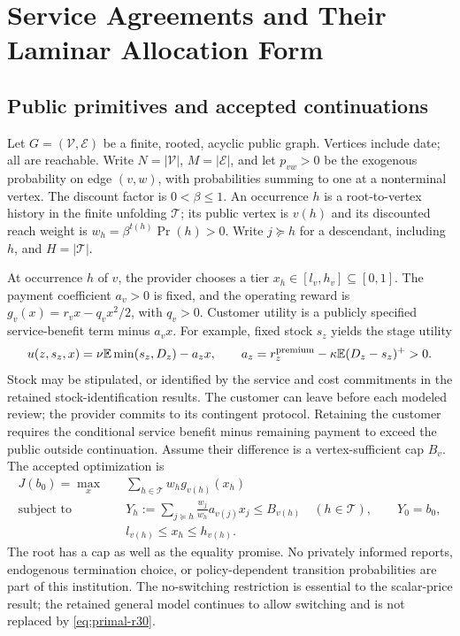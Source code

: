 \section{Service Agreements and Their Laminar Allocation Form}\label{sec:model}
\subsection{Public primitives and accepted continuations}
Let $G=(\mathcal V,\mathcal E)$ be a finite, rooted, acyclic public graph. Vertices include date; all are reachable. Write $N=|\mathcal V|$, $M=|\mathcal E|$, and let $p_{vw}>0$ be the exogenous probability on edge $(v,w)$, with probabilities summing to one at a nonterminal vertex. The discount factor is $0<\beta\leq1$. An occurrence $h$ is a root-to-vertex history in the finite unfolding $\mathcal T$; its public vertex is $v(h)$ and its discounted reach weight is $w_h=\beta^{t(h)}\Pr(h)>0$. Write $j\succeq h$ for a descendant, including $h$, and $H=|\mathcal T|$.

At occurrence $h$ of $v$, the provider chooses a tier $x_h\in[l_v,h_v]\subseteq[0,1]$. The payment coefficient $a_v>0$ is fixed, and the operating reward is $g_v(x)=r_vx-q_vx^2/2$, with $q_v>0$. Customer utility is a publicly specified service-benefit term minus $a_vx$. For example, fixed stock $s_z$ yields the stage utility
\begin{equation}\label{eq:customer-r30}
 u(z,s_z,x)=\nu\mathbb E\min(s_z,D_z)-a_zx,
 \qquad a_z=r_z^{\rm premium}-\kappa\mathbb E(D_z-s_z)^+>0.
\end{equation}
Stock may be stipulated, or identified by the service and cost commitments in the retained stock-identification results. The customer can leave before each modeled review; the provider commits to its contingent protocol. Retaining the customer requires the conditional service benefit minus remaining payment to exceed the public outside continuation. Assume their difference is a vertex-sufficient cap $B_v$. The accepted optimization is
\begin{align}
 J(b_0)=\max_x\quad &\sum_{h\in\mathcal T}w_hg_{v(h)}(x_h) \label{eq:primal-r30}\\
 \text{subject to}\quad
 &Y_h:=\sum_{j\succeq h}\frac{w_j}{w_h}a_{v(j)}x_j\leq B_{v(h)}\quad(h\in\mathcal T),\qquad Y_0=b_0,\nonumber\\
 &l_{v(h)}\leq x_h\leq h_{v(h)}.\nonumber
\end{align}
The root has a cap as well as the equality promise. No privately informed reports, endogenous termination choice, or policy-dependent transition probabilities are part of this institution. The no-switching restriction is essential to the scalar-price result; the retained general model continues to allow switching and is not replaced by \eqref{eq:primal-r30}.

